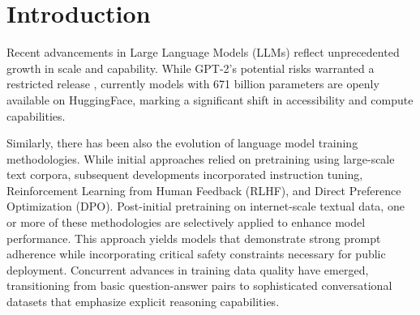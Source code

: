 \documentclass{article}
\begin{document}


\section{Introduction}
\label{Introduction}

Recent advancements in Large Language Models (LLMs) reflect unprecedented growth in scale and capability. While GPT-2's potential risks warranted a restricted release \cite{openai_better_2019}, currently models with 671 billion parameters are openly available on HuggingFace, marking a significant shift in accessibility and compute capabilities. \cite{deepseek-ai_deepseek-r1_2025}


Similarly, there has been also the evolution of language model training methodologies. While initial approaches relied on pretraining using large-scale text corpora, subsequent developments incorporated instruction tuning, Reinforcement Learning from Human Feedback (RLHF), and Direct Preference Optimization (DPO).\cite{ouyang_training_2022, rafailov_direct_2024} Post-initial pretraining on internet-scale textual data, one or more of these methodologies are selectively applied to enhance model performance. This approach yields models that demonstrate strong prompt adherence while incorporating critical safety constraints necessary for public deployment. Concurrent advances in training data quality have emerged, transitioning from basic question-answer pairs to sophisticated conversational datasets that emphasize explicit reasoning capabilities.\cite{deepseek-ai_deepseek-r1_2025}

\end{document}
